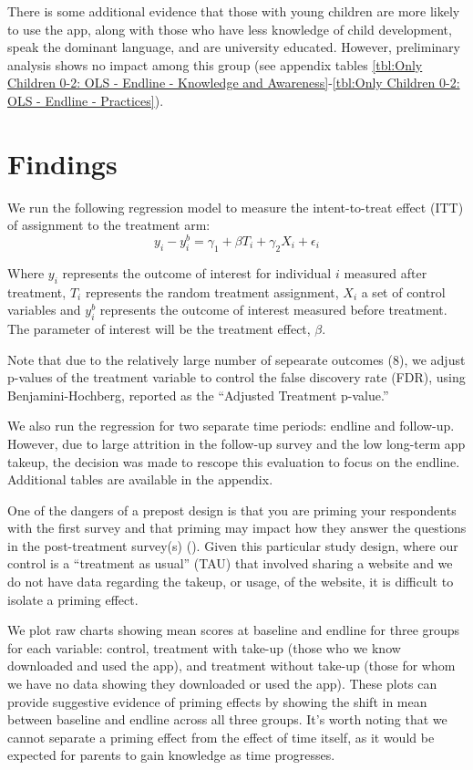 \documentclass{article}
\begin{document}
There is some additional evidence that those with young children are more likely to use the app, along with those who have less knowledge of child development, speak the dominant language, and are university educated. However, preliminary analysis shows no impact among this group (see appendix tables \ref{tbl:Only Children 0-2: OLS - Endline - Knowledge and Awareness}-\ref{tbl:Only Children 0-2: OLS - Endline - Practices}).






\section{Findings}

We run the following regression model to measure the intent-to-treat effect (ITT) of assignment to the treatment arm:
$$
y_{i} - y^{b}_i = \gamma_1 + \beta T_{i} + \gamma_2X_{i} + \epsilon_i
$$

Where $y_i$ represents the outcome of interest for individual $i$ measured after treatment, $T_i$ represents the random treatment assignment, $X_i$ a set of control variables and $y^b_i$ represents the outcome of interest measured before treatment. The parameter of interest will be the treatment effect, $\beta$.

Note that due to the relatively large number of sepearate outcomes (8), we adjust p-values of the treatment variable to control the false discovery rate (FDR), using Benjamini-Hochberg, reported as the ``Adjusted Treatment p-value.''

We also run the regression for two separate time periods: endline and follow-up. However, due to large attrition in the follow-up survey and the low long-term app takeup, the decision was made to rescope this evaluation to focus on the endline. Additional tables are available in the appendix.

One of the dangers of a prepost design is that you are priming your respondents with the first survey and that priming may impact how they answer the questions in the post-treatment survey(s) (\cite{Stantcheva2023}). Given this particular study design, where our control is a ``treatment as usual'' (TAU) that involved sharing a website and we do not have data regarding the takeup, or usage, of the website, it is difficult to isolate a priming effect.

We plot raw charts showing mean scores at baseline and endline for three groups for each variable: control, treatment with take-up (those who we know downloaded and used the app), and treatment without take-up (those for whom we have no data showing they downloaded or used the app). These plots can provide suggestive evidence of priming effects by showing the shift in mean between baseline and endline across all three groups. It’s worth noting that we cannot separate a priming effect from the effect of time itself, as it would be expected for parents to gain knowledge as time progresses.
\end{document}
